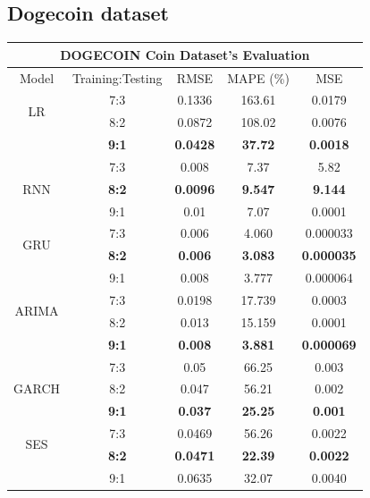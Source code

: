 \documentclass{ieeeojies}
\begin{document}
\subsection{Dogecoin dataset}
\vspace{-6mm}
\begin{table}[H]
  \centering
  \begin{tabular}{|c|c|c|c|c|}
    \hline
    \multicolumn{5}{|c|}{\textbf{DOGECOIN Coin Dataset's Evaluation}}                                \\
    \hline
    \centering Model       & Training:Testing & RMSE            & MAPE (\%)      & MSE               \\
    \hline
    \multirow{2}{*}{LR}    & 7:3              & 0.1336          & 163.61         & 0.0179            \\ & 8:2 &  0.0872 & 108.02 & 0.0076 \\ & \textbf{9:1} & \textbf{0.0428} & \textbf{37.72} & \textbf{0.0018} \\
    \hline
    \multirow{3}{*}{RNN}   & 7:3              & 0.008           & 7.37           & 5.82              \\ & \textbf{8:2} & \textbf{0.0096} & \textbf{9.547} & \textbf{9.144} \\ & 9:1 & 0.01 & 7.07 & 0.0001 \\
    \hline
    \multirow{2}{*}{GRU}   & 7:3              & 0.006           & 4.060          & 0.000033          \\ &  \textbf{8:2} & \textbf{0.006} &  \textbf{3.083} & \textbf{0.000035} \\ & 9:1 & 0.008 & 3.777 & 0.000064\\
    \hline
    \multirow{2}{*}{ARIMA} & 7:3              & 0.0198          & 17.739         & 0.0003            \\ & 8:2 & 0.013 &15.159 & 0.0001 \\ & \textbf{9:1} & \textbf{0.008} & \textbf{3.881} & \textbf{0.000069}\\
    \hline
    \multirow{3}{*}{GARCH} & 7:3              & 0.05            & 66.25          & 0.003             \\
                           & 8:2              & 0.047           & 56.21          & 0.002             \\
                           & \textbf{9:1}     & \textbf{0.037}  & \textbf{25.25} & \textbf{0.001}    \\
    \hline
    \multirow{2}{*}{SES}   & 7:3              & 0.0469          & 56.26          & 0.0022            \\ & \textbf{8:2} & \textbf{0.0471} & \textbf{22.39} & \textbf{0.0022} \\ & 9:1 &  0.0635 & 32.07 & 0.0040 \\

\end{tabular}
\end{table}
\end{document}

